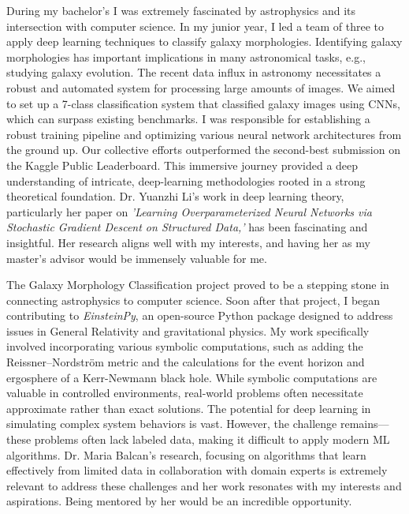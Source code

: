 \documentclass{article}
\begin{document}
During my bachelor's I was extremely fascinated by astrophysics and its
intersection with computer science. In my junior year, I led a team of three to
apply deep learning techniques to classify galaxy morphologies. Identifying galaxy
morphologies has important implications in many astronomical tasks, e.g.,
studying galaxy evolution. The recent data influx in astronomy necessitates a
robust and automated system for processing large amounts of images. We aimed to
set up a 7-class classification system that classified galaxy images using CNNs,
which can surpass existing benchmarks. I was responsible for establishing a
robust training pipeline and optimizing various neural network architectures
from the ground up. Our collective efforts outperformed the second-best
submission on the Kaggle Public Leaderboard. This immersive journey provided a
deep understanding of intricate, deep-learning methodologies rooted in a strong
theoretical foundation. Dr. Yuanzhi Li's work in deep learning theory,
particularly her paper on \textit{'Learning Overparameterized Neural Networks via
Stochastic Gradient Descent on Structured Data,'} has been fascinating and
insightful. Her research aligns well with my interests, and having her as my
master’s advisor would be immensely valuable for me.

The Galaxy Morphology Classification project proved to be a stepping stone in
connecting astrophysics to computer science. Soon after that project, I began
contributing to \textit{EinsteinPy}, an open-source Python package designed to address
issues in General Relativity and gravitational physics. My work specifically
involved incorporating various symbolic computations, such as adding the
Reissner–Nordström metric and the calculations for the event horizon and
ergosphere of a Kerr-Newmann black hole. While symbolic computations are
valuable in controlled environments, real-world problems often necessitate
approximate rather than exact solutions. The potential for deep learning in
simulating complex system behaviors is vast. However, the challenge
remains—these problems often lack labeled data, making it difficult to apply
modern ML algorithms. Dr. Maria Balcan's research, focusing on algorithms that
learn effectively from limited data in collaboration with domain experts is
extremely relevant to address these challenges and her work resonates with my
interests and aspirations. Being mentored by her would be an incredible
opportunity.
\end{document}
